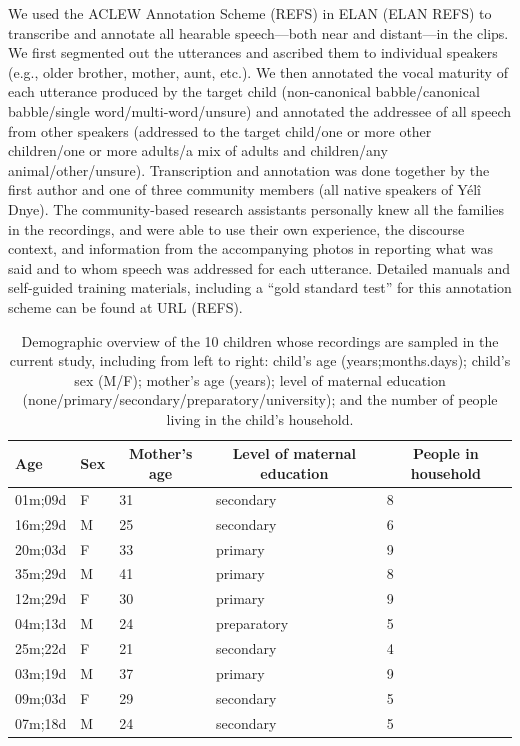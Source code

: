 \documentclass[,man,floatsintext]{apa6}
\begin{document}
We used the ACLEW Annotation Scheme (REFS) in ELAN (ELAN REFS) to
transcribe and annotate all hearable speech---both near and distant---in
the clips. We first segmented out the utterances and ascribed them to
individual speakers (e.g., older brother, mother, aunt, etc.). We then
annotated the vocal maturity of each utterance produced by the target
child (non-canonical babble/canonical babble/single
word/multi-word/unsure) and annotated the addressee of all speech from
other speakers (addressed to the target child/one or more other
children/one or more adults/a mix of adults and children/any
animal/other/unsure). Transcription and annotation was done together by
the first author and one of three community members (all native speakers
of Yélî Dnye). The community-based research assistants personally knew
all the families in the recordings, and were able to use their own
experience, the discourse context, and information from the accompanying
photos in reporting what was said and to whom speech was addressed for
each utterance. Detailed manuals and self-guided training materials,
including a \enquote{gold standard test} for this annotation scheme can
be found at URL (REFS).

\begin{table}[tbp]
\begin{center}
\begin{threeparttable}
\caption{\label{tab:tab1}Demographic overview of the 10 children whose recordings are sampled in the current study, including from left to right: child's age (years;months.days); child's sex (M/F); mother's age (years); level of maternal education (none/primary/secondary/preparatory/university); and the number of people living in the child's household.}
\begin{tabular}{lllll}
\toprule
Age & \multicolumn{1}{c}{Sex} & \multicolumn{1}{c}{Mother's age} & \multicolumn{1}{c}{Level of maternal education} & \multicolumn{1}{c}{People in household}\\
\midrule
01m;09d & F & 31 & secondary & 8\\
16m;29d & M & 25 & secondary & 6\\
20m;03d & F & 33 & primary & 9\\
35m;29d & M & 41 & primary & 8\\
12m;29d & F & 30 & primary & 9\\
04m;13d & M & 24 & preparatory & 5\\
25m;22d & F & 21 & secondary & 4\\
03m;19d & M & 37 & primary & 9\\
09m;03d & F & 29 & secondary & 5\\
07m;18d & M & 24 & secondary & 5\\
\bottomrule
\end{tabular}
\end{threeparttable}
\end{center}
\end{table}
\end{document}
